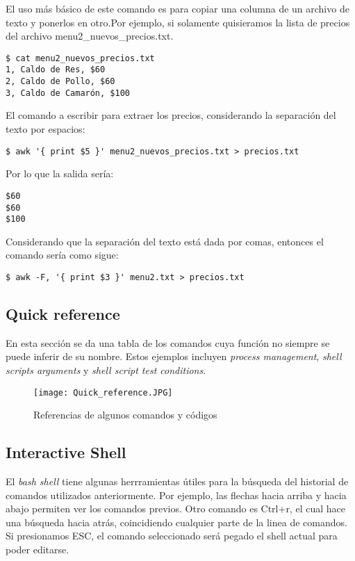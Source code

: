 \documentclass[a4paper]{article}
\begin{document}
\begin{itemize}
El uso más básico de este comando es para copiar una columna de un archivo de texto y ponerlos en otro.Por ejemplo, si solamente quisieramos la lista de precios del archivo menu2\_nuevos\_precios.txt.

\begin{verbatim}
$ cat menu2_nuevos_precios.txt
1, Caldo de Res, $60
2, Caldo de Pollo, $60
3, Caldo de Camarón, $100
\end{verbatim}

El comando a escribir para extraer los precios, considerando la separación del texto por espacios:
\begin{verbatim}
$ awk '{ print $5 }' menu2_nuevos_precios.txt > precios.txt
\end{verbatim}

Por lo que la salida sería:

\begin{verbatim}
$60
$60
$100
\end{verbatim}

Considerando que la separación del texto está dada por comas, entonces el comando sería como sigue:

\begin{verbatim}
$ awk -F, '{ print $3 }' menu2.txt > precios.txt
\end{verbatim}
\end{itemize}


\subsection{Quick reference}
En esta sección se da una tabla de los comandos cuya función no siempre se puede inferir de su nombre. Estos ejemplos incluyen \textit{process management}, \textit{shell scripts arguments} y \textit{shell script test conditions}.

\begin{figure}[ht!]
\centering
\texttt{[image: Quick\_reference.JPG]}
\caption{\label{fig:}Referencias de algunos comandos y códigos}
\end{figure}

\newpage

\subsection{Interactive Shell}

El \textit{bash shell} tiene algunas herrramientas útiles para la búsqueda del historial de comandos utilizados anteriormente. Por ejemplo, las flechas hacia arriba y hacia abajo permiten ver los comandos previos. Otro comando es Ctrl+r, el cual hace una búsqueda hacia atrás, coincidiendo cualquier parte de la linea de comandos. Si presionamos ESC, el comando seleccionado será pegado el shell actual para poder editarse.
\end{document}
